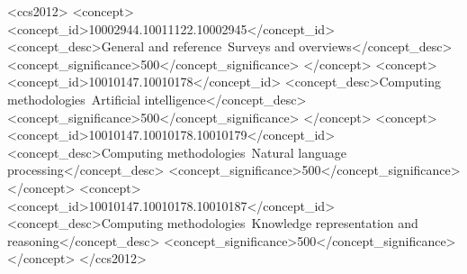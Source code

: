 
\begin{CCSXML}
    <ccs2012>
    <concept>
        <concept_id>10002944.10011122.10002945</concept_id>
        <concept_desc>General and reference~Surveys and overviews</concept_desc>
        <concept_significance>500</concept_significance>
    </concept>
    <concept>
        <concept_id>10010147.10010178</concept_id>
        <concept_desc>Computing methodologies~Artificial intelligence</concept_desc>
        <concept_significance>500</concept_significance>
    </concept>
    <concept>
        <concept_id>10010147.10010178.10010179</concept_id>
        <concept_desc>Computing methodologies~Natural language processing</concept_desc>
        <concept_significance>500</concept_significance>
    </concept>
    <concept>
        <concept_id>10010147.10010178.10010187</concept_id>
        <concept_desc>Computing methodologies~Knowledge representation and reasoning</concept_desc>
        <concept_significance>500</concept_significance>
    </concept>
    </ccs2012>
\end{CCSXML}


